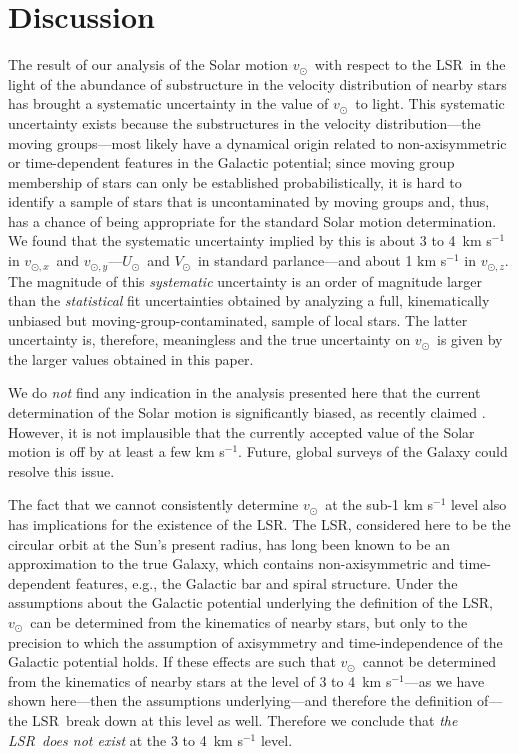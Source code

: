 \documentclass[12pt,preprint]{aastex}
\newcommand{\eg}{e.g.}
\newcommand{\vsunlsr}{\ensuremath{v_\odot}}
\newcommand{\vsunlsrx}{\ensuremath{v_{\odot,x}}}
\newcommand{\vsunlsry}{\ensuremath{v_{\odot,y}}}
\newcommand{\vsunlsrz}{\ensuremath{v_{\odot,z}}}
\newcommand{\lsrabb}{LSR}
\newcommand{\resultrange}{3 to 4}
\newcommand{\usol}{\ensuremath{U_{\odot}}}
\newcommand{\vsol}{\ensuremath{V_{\odot}}}
\begin{document}
\section{Discussion}\label{sec:discuss}

The result of our analysis of the Solar motion \vsunlsr\ with respect
to the \lsrabb\ in the light of the abundance of substructure in the
velocity distribution of nearby stars has brought a systematic
uncertainty in the value of \vsunlsr\ to light. This systematic
uncertainty exists because the substructures in the velocity
distribution---the moving groups---most likely have a dynamical origin
related to non-axisymmetric or time-dependent features in the Galactic
potential; since moving group membership of stars can only be
established probabilistically, it is hard to identify a sample of
stars that is uncontaminated by moving groups and, thus, has a chance
of being appropriate for the standard Solar motion determination. We
found that the systematic uncertainty implied by this is about
\resultrange\ km s$^{-1}$ in \vsunlsrx\ and \vsunlsry---\usol\ and
\vsol\ in standard parlance---and about 1 km s$^{-1}$ in \vsunlsrz.
The magnitude of this \emph{systematic} uncertainty is an order of
magnitude larger than the \emph{statistical} fit uncertainties
obtained by analyzing a full, kinematically unbiased but
moving-group-contaminated, sample of local stars. The latter
uncertainty is, therefore, meaningless and the true uncertainty on
\vsunlsr\ is given by the larger values obtained in this paper.

We do \emph{not} find any indication in the analysis presented here
that the current determination of the Solar motion is significantly
biased, as recently claimed \citep{Binney09a}. However, it is not
implausible that the currently accepted value of the Solar motion is
off by at least a few km s$^{-1}$. Future, global surveys of the
Galaxy could resolve this issue.

The fact that we cannot consistently determine \vsunlsr\ at the sub-1
km s$^{-1}$ level also has implications for the existence of the
\lsrabb. The \lsrabb, considered here to be the circular orbit at the
Sun's present radius, has long been known to be an approximation to
the true Galaxy, which contains non-axisymmetric and time-dependent
features, \eg, the Galactic bar and spiral structure. Under the
assumptions about the Galactic potential underlying the definition of
the \lsrabb, \vsunlsr\ can be determined from the kinematics of nearby
stars, but only to the precision to which the assumption of
axisymmetry and time-independence of the Galactic potential holds. If
these effects are such that \vsunlsr\ cannot be determined from the
kinematics of nearby stars at the level of \resultrange\ km
s$^{-1}$---as we have shown here---then the assumptions
underlying---and therefore the definition of---the \lsrabb\ break down
at this level as well. Therefore we conclude that \emph{the \lsrabb\
does not exist} at the \resultrange\ km s$^{-1}$ level.
\end{document}
